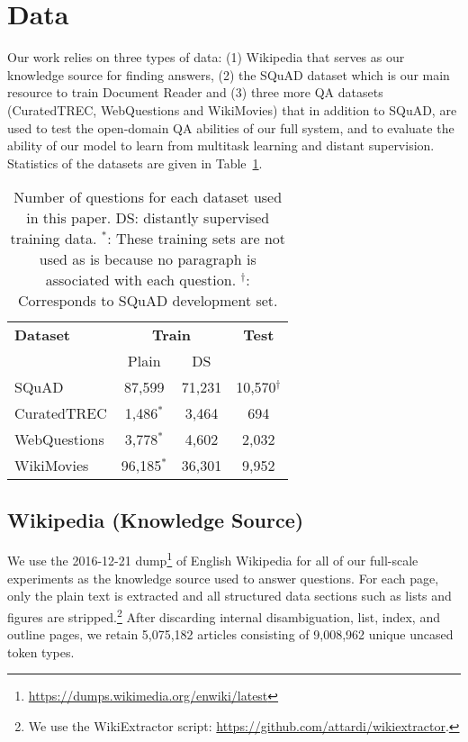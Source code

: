 \documentclass[11pt,a4paper]{article}
\newcommand\squad{SQuAD\xspace}
\newcommand\lcurq{CuratedTREC\xspace}
\newcommand\wikim{WikiMovies\xspace}
\newcommand\wq{WebQuestions\xspace}
\newcommand\usp{Document Reader\xspace}
\begin{document}
\section{Data} \label{sec:data}

Our work relies on three types of data: (1) Wikipedia that serves as our knowledge source for finding answers, (2) the SQuAD dataset which is our main resource to train \usp and (3) three more QA datasets (CuratedTREC, WebQuestions and WikiMovies)  that in addition to SQuAD, are used to test the open-domain QA abilities of our full system, and to evaluate the ability of our model to learn from multitask learning and distant supervision.
Statistics of the datasets are given in Table~\ref{tab:data-stats}.

\begin{table}[h]
\begin{center}
\begin{tabular}{l|c@{\,\,}c@{\,\,}c}
\hline
\bf Dataset & \multicolumn{2}{c}{\bf Train} & \bf Test  \\
& Plain & DS &  \\
\hline
\squad &  87,599 & 71,231 & 10,570$^{\dagger}$ \\
\lcurq &  1,486$^{*}$ & 3,464 & 694 \\
\wq &  3,778$^{*}$ & 4,602 & 2,032 \\
\wikim &  96,185$^{*}$ & 36,301 & 9,952 \\
\hline
\end{tabular}
\end{center}
\caption{\label{tab:data-stats} Number of questions for each dataset used in this paper. DS: distantly supervised training data.
$^{*}$: These training sets are not used as is because no paragraph is associated with each question.
$^{\dagger}$: Corresponds to SQuAD development set.}
\end{table}

\subsection{Wikipedia (Knowledge Source)}
We use the 2016-12-21 dump\footnote{\url{https://dumps.wikimedia.org/enwiki/latest}} of English Wikipedia for all of our full-scale experiments as the knowledge source used to answer questions. For each page, only the plain text is extracted and all structured data sections such as lists and figures are stripped.\footnote{We use the WikiExtractor script: \url{https://github.com/attardi/wikiextractor}.} After discarding internal disambiguation, list, index, and outline pages, we retain 5,075,182 articles consisting of 9,008,962 unique uncased token types.
\end{document}

